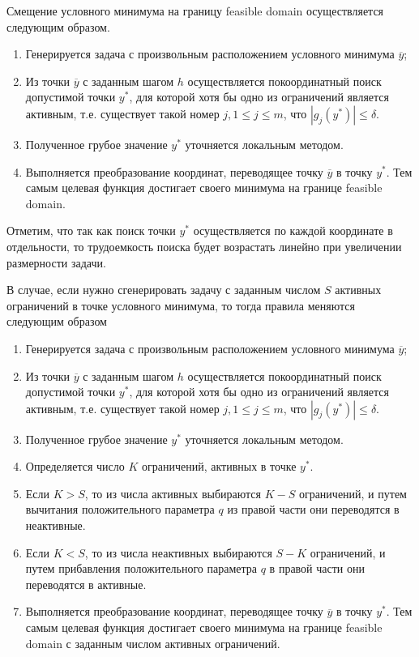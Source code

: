 \documentclass{aip-cp}
\begin{document}
Смещение условного минимума на границу feasible domain осуществляется следующим образом.
\begin{enumerate}
	\item Генерируется задача с произвольным расположением условного минимума $\overline{y}$;
	\item Из точки $\overline{y}$ с заданным шагом $h$ осуществляется покоординатный поиск допустимой точки $y^*$, для которой хотя бы одно из ограничений является активным, т.е. существует такой номер $j, 1 \leq j\leq m$, что $\left|g_j(y^*)\right| \leq \delta$. 
	\item Полученное грубое значение $y^*$ уточняется локальным методом. 
	\item Выполняется преобразование координат, переводящее точку $\overline{y}$ в точку $y^*$. Тем самым целевая функция достигает своего минимума на границе feasible domain. 
\end{enumerate}

Отметим, что так как поиск точки $y^*$ осуществляется по каждой координате в отдельности, то трудоемкость поиска будет возрастать линейно при увеличении размерности задачи.

В случае, если нужно сгенерировать задачу с заданным числом $S$ активных ограничений в точке условного минимума, то тогда правила меняются следующим образом 
\begin{enumerate}
	\item Генерируется задача с произвольным расположением условного минимума $\overline{y}$;
	\item Из точки $\overline{y}$ с заданным шагом $h$ осуществляется покоординатный поиск допустимой точки $y^*$, для которой хотя бы одно из ограничений является активным, т.е. существует такой номер $j, 1 \leq j\leq m$, что $\left|g_j(y^*)\right| \leq \delta$.  
	\item Полученное грубое значение $y^*$ уточняется локальным методом. 
	\item Определяется число $K$ ограничений, активных в точке $y^*$.
	\item Если $K>S$, то из числа активных выбираются $K-S$ ограничений, и путем вычитания положительного параметра $q$ из правой части они переводятся в неактивные.
	\item Если $K<S$, то из числа неактивных выбираются $S-K$ ограничений, и путем прибавления положительного параметра $q$ в правой части они переводятся в активные.
	\item Выполняется преобразование координат, переводящее точку $\overline{y}$ в точку $y^*$. Тем самым целевая функция достигает своего минимума на границе feasible domain с заданным числом активных ограничений. 
\end{enumerate}
\end{document}
